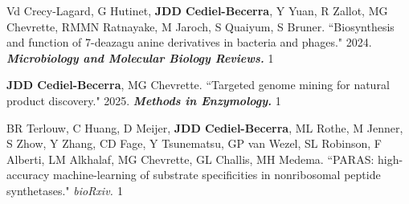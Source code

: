 \begin{cvpubs}


\cvpub
{Vd Crecy-Lagard, G Hutinet, \textbf{JDD Cediel-Becerra}, Y Yuan, R Zallot, MG Chevrette, RMMN Ratnayake, M Jaroch, S Quaiyum, S Bruner. ``Biosynthesis and function of 7-deazagu
anine derivatives in bacteria and phages." 2024. \textit{\textbf{Microbiology and Molecular Biology Reviews.}}\textit{\textbf{}}}
{1}

\end{cvpubs}



 \vspace{-2mm}

\begin{cvpubs}


\cvpub
{\textbf{JDD Cediel-Becerra}, MG Chevrette. ``Targeted genome mining for natural product discovery." 2025. \textit{\textbf{Methods in Enzymology.}} \textit{\textbf{}}}
{1}

\end{cvpubs}








 \vspace{-2mm}

\begin{cvpubs}


\cvpub
{BR Terlouw, C Huang, D Meijer, \textbf{JDD Cediel-Becerra}, ML Rothe, M Jenner, S Zhow, Y Zhang, CD Fage, Y Tsunematsu, GP van Wezel, SL Robinson, F Alberti, LM Alkhalaf, MG Chevrette, GL Challis, MH Medema. ``PARAS: high-accuracy machine-learning of substrate specificities in nonribosomal peptide synthetases." \textit{bioRxiv. \textbf{}}}
{1}


\end{cvpubs}
